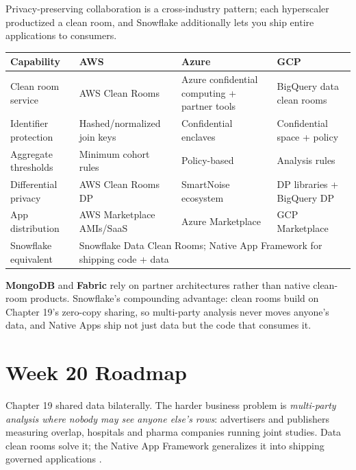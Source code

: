 \begin{crosscloud}
Privacy-preserving collaboration is a cross-industry pattern; each hyperscaler productized a clean room, and Snowflake additionally lets you ship entire applications to consumers.

\vspace{2mm}
{\footnotesize
\begin{tabular}{@{}p{2.8cm}p{3.0cm}p{3.0cm}p{3.0cm}@{}}
\toprule
\textbf{Capability} & \textbf{AWS} & \textbf{Azure} & \textbf{GCP} \\
\midrule
Clean room service & AWS Clean Rooms & Azure confidential computing + partner tools & BigQuery data clean rooms \\
Identifier protection & Hashed/normalized join keys & Confidential enclaves & Confidential space + policy \\
Aggregate thresholds & Minimum cohort rules & Policy-based & Analysis rules \\
Differential privacy & AWS Clean Rooms DP & SmartNoise ecosystem & DP libraries + BigQuery DP \\
App distribution & AWS Marketplace AMIs/SaaS & Azure Marketplace & GCP Marketplace \\
\addlinespace
Snowflake equivalent & \multicolumn{3}{l}{Snowflake Data Clean Rooms; Native App Framework for shipping code + data} \\
\bottomrule
\end{tabular}}

\vspace{1mm}
\textbf{MongoDB} and \textbf{Fabric} rely on partner architectures rather than native clean-room products. Snowflake's compounding advantage: clean rooms build on Chapter 19's zero-copy sharing, so multi-party analysis never moves anyone's data, and Native Apps ship not just data but the code that consumes it.
\end{crosscloud}

\section{Week 20 Roadmap}
Chapter 19 shared data bilaterally. The harder business problem is \emph{multi-party analysis where nobody may see anyone else's rows}: advertisers and publishers measuring overlap, hospitals and pharma companies running joint studies. Data clean rooms solve it; the Native App Framework generalizes it into shipping governed applications \cite{snowflakeCleanRoomsDocs,snowflakeNativeAppsDocs}.

